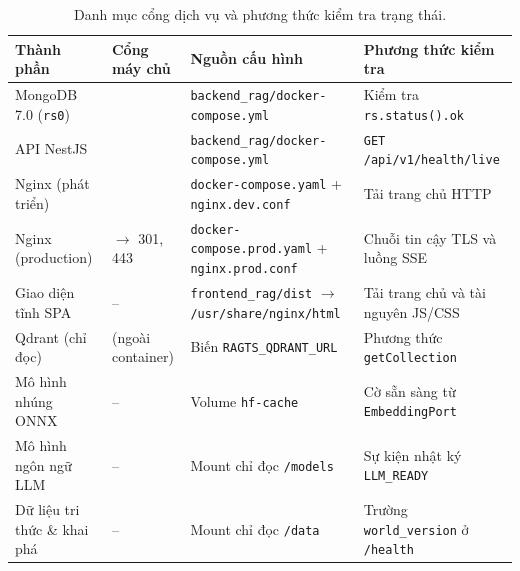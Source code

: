 \begin{table}[htbp]
    \centering
    \caption{Danh mục cổng dịch vụ và phương thức kiểm tra trạng thái.}
    \label{tab:cong-ket-noi-he-thong}
    \small
    \begin{tabularx}{\textwidth}{@{}>{\raggedright\arraybackslash}p{}>{\raggedright\arraybackslash}p{}>{\raggedright\arraybackslash}p{}>{\raggedright\arraybackslash}X@{}}
        \toprule
        \textbf{Thành phần} & \textbf{Cổng máy chủ} & \textbf{Nguồn cấu hình} & \textbf{Phương thức kiểm tra} \\
        \midrule
        MongoDB 7.0 (\texttt{rs0}) & 27018 & \texttt{backend\_\allowbreak{}rag/\allowbreak{}docker-\allowbreak{}compose.\allowbreak{}yml} & Kiểm tra \texttt{rs.\allowbreak{}status().\allowbreak{}ok} \\
        API NestJS & 3000 & \texttt{backend\_\allowbreak{}rag/\allowbreak{}docker-\allowbreak{}compose.\allowbreak{}yml} & \texttt{GET /\allowbreak{}api/\allowbreak{}v1/\allowbreak{}health/\allowbreak{}live} \\
        Nginx (phát triển) & 80 & \texttt{docker-\allowbreak{}compose.\allowbreak{}yaml} + \texttt{nginx.\allowbreak{}dev.\allowbreak{}conf} & Tải trang chủ HTTP \\
        Nginx (production) & 80 $\rightarrow$ 301, 443 & \texttt{docker-\allowbreak{}compose.\allowbreak{}prod.\allowbreak{}yaml} + \texttt{nginx.\allowbreak{}prod.\allowbreak{}conf} & Chuỗi tin cậy TLS và luồng SSE \\
        Giao diện tĩnh SPA & -- & \texttt{frontend\_\allowbreak{}rag/\allowbreak{}dist} $\rightarrow$ \texttt{/\allowbreak{}usr/\allowbreak{}share/\allowbreak{}nginx/\allowbreak{}html} & Tải trang chủ và tài nguyên JS/CSS \\
        Qdrant (chỉ đọc) & 6333 (ngoài container) & Biến \texttt{RAGTS\_\allowbreak{}QDRANT\_\allowbreak{}URL} & Phương thức \texttt{getCollection} \\
        Mô hình nhúng ONNX & -- & Volume \texttt{hf-\allowbreak{}cache} & Cờ sẵn sàng từ \texttt{EmbeddingPort} \\
        Mô hình ngôn ngữ LLM & -- & Mount chỉ đọc \texttt{/\allowbreak{}models} & Sự kiện nhật ký \texttt{LLM\_\allowbreak{}READY} \\
        Dữ liệu tri thức \& khai phá & -- & Mount chỉ đọc \texttt{/\allowbreak{}data} & Trường \texttt{world\_\allowbreak{}version} ở \texttt{/\allowbreak{}health} \\
        \bottomrule
    \end{tabularx}
\end{table}

